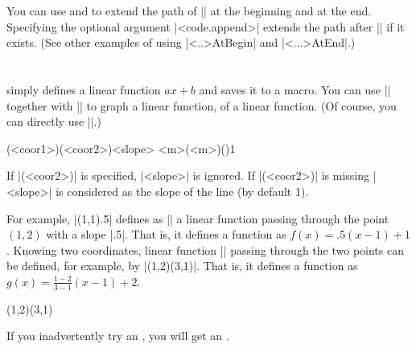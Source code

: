 \begin{tzcode}{.3}
\end{tzcode}


You can use \icmd{\tzLFnofyAtBegin} and \icmd{\tzLFnofyAtEnd} to extend the path of |\tzLFnofy| at the beginning and at the end. Specifying the optional argument |<code.append>| extends the path after |\tzLFnofyAtEnd| if it exists.
(See other examples of using |\tz<..>AtBegin| and |\tz<...>AtEnd|.)


\section{\protect\cmd{\tzdefLFn}}
\label{s:tzdefLFn}

\icmd{\tzdefLFn} simply defines a linear function $ax+b$ and saves it to a macro.
You can use |\tzdefLFn| together with |\tzfn| to graph a linear function,  of a linear function.
(Of course, you can directly use |\tzLFn|.)

\begin{tzdef}
(<coor1>)(<coor2>){<slope>}
{<m>}(<m>)(){1}
\end{tzdef}

If |(<coor2>)| is specified, |{<slope>}| is ignored.
If |(<coor2>)| is missing |<slope>| is considered as the slope of the line (by default 1). 

For example, |\tzdefLFn{\Gx}(1,1){.5}| defines as |\Gx| a linear function passing through the point $(1,2)$ with a slope |.5|.
That is, it defines a function as $f(x)=.5(x-1)+1$.
Knowing two coordinates, linear function |\Gx| passing through the two points can be defined, for example, by |\tzdefLFn{\Gx}(1,2)(3,1)|.
That is, it defines a function as $g(x)=\frac{1-2}{3-1}(x-1)+2$.


\begin{tztikz}
\tzdefLFn{\Fx}(1,2)(3,1) %
  \def\Fx{-1/2*(\x-1)+2}
\end{tztikz}

\remark If you inadvertently try an , you will get an .


\begin{tzcode}{.3}
{}
\end{tzcode}

